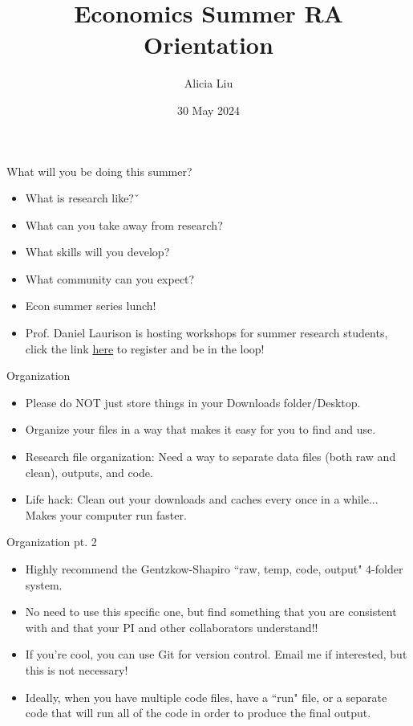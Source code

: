 \documentclass{beamer}
\title{Economics Summer RA Orientation}
\institute{Swarthmore College}
\author{Alicia Liu}
\date{30 May 2024}
\begin{document}
\maketitle

\begin{frame}{What will you be doing this summer?}
    \begin{itemize}
        \item What is research like?ˇ

        \item What can you take away from research? 
        
        \item What skills will you develop?

        \item What community can you expect? 

        \item Econ summer series lunch! 

        \item Prof. Daniel Laurison is hosting workshops for summer research students, click the link \href{https://docs.google.com/forms/d/e/1FAIpQLSdeKToK8gTFQD55tRaMmmqATAv2H2DuJwa_c2ph7Kq9sZzQjA/viewform}{here} to register and be in the loop!
    \end{itemize}

\end{frame}

\begin{frame}{Organization}

    \begin{itemize}
        \item Please do NOT just store things in your Downloads folder/Desktop. 
        \item Organize your files in a way that makes it easy for you to find and use. 
        \item Research file organization: Need a way to separate data files (both raw and clean), outputs, and code. 
        \item Life hack: Clean out your downloads and caches every once in a while... Makes your computer run faster.
    \end{itemize}
    
\end{frame}

\begin{frame}{Organization pt. 2}
    \begin{itemize}
        \item Highly recommend the Gentzkow-Shapiro ``raw, temp, code, output" 4-folder system. 
        \item No need to use this specific one, but find something that you are consistent with and that your PI and other collaborators understand!!
        \item If you're cool, you can use Git for version control. Email me if interested, but this is not necessary!
        \item Ideally, when you have multiple code files, have a ``run" file, or a separate code that will run all of the code in order to produce the final output. 
    \end{itemize}
\end{frame}
\end{document}
